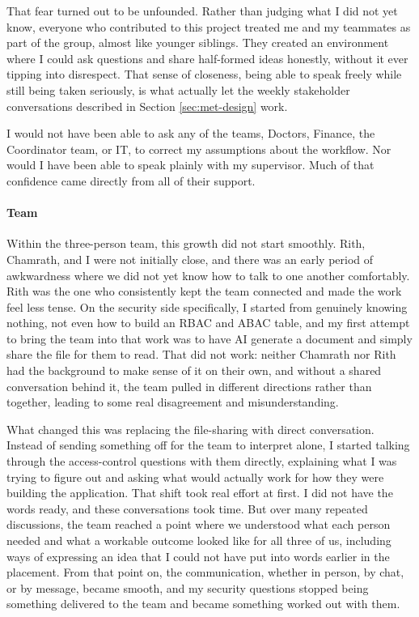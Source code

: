 That fear turned out to be unfounded. Rather than judging what I did not yet know, everyone who contributed to this project treated me and my teammates as part of the group, almost like younger siblings. They created an environment where I could ask questions and share half-formed ideas honestly, without it ever tipping into disrespect. That sense of closeness, being able to speak freely while still being taken seriously, is what actually let the weekly stakeholder conversations described in Section \ref{sec:met-design} work.

I would not have been able to ask any of the teams, Doctors, Finance, the Coordinator team, or IT, to correct my assumptions about the workflow. Nor would I have been able to speak plainly with my supervisor. Much of that confidence came directly from all of their support.

\paragraph{Team}

Within the three-person team, this growth did not start smoothly. Rith, Chamrath, and I were not initially close, and there was an early period of awkwardness where we did not yet know how to talk to one another comfortably. Rith was the one who consistently kept the team connected and made the work feel less tense. On the security side specifically, I started from genuinely knowing nothing, not even how to build an RBAC and ABAC table, and my first attempt to bring the team into that work was to have AI generate a document and simply share the file for them to read. That did not work: neither Chamrath nor Rith had the background to make sense of it on their own, and without a shared conversation behind it, the team pulled in different directions rather than together, leading to some real disagreement and misunderstanding.

What changed this was replacing the file-sharing with direct conversation. Instead of sending something off for the team to interpret alone, I started talking through the access-control questions with them directly, explaining what I was trying to figure out and asking what would actually work for how they were building the application. That shift took real effort at first. I did not have the words ready, and these conversations took time. But over many repeated discussions, the team reached a point where we understood what each person needed and what a workable outcome looked like for all three of us, including ways of expressing an idea that I could not have put into words earlier in the placement. From that point on, the communication, whether in person, by chat, or by message, became smooth, and my security questions stopped being something delivered to the team and became something worked out with them.

